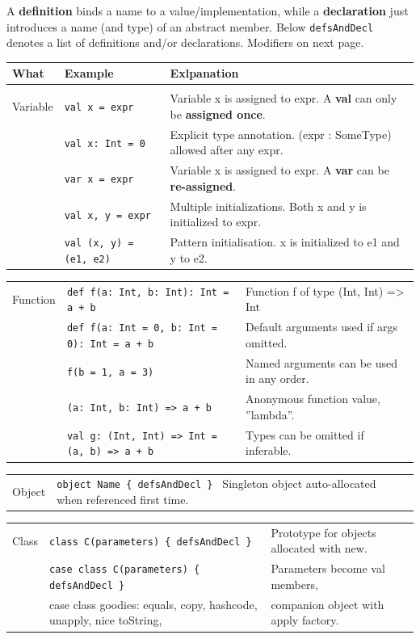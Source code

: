 \documentclass[article, a5paper]{memoir}
\newcommand{\code}{\lstinline[basicstyle=\ttfamily]}
\begin{document}
{\small
A \textbf{definition} binds a name to a value/implementation, while a \textbf{declaration} just introduces a name (and type) of an abstract member. Below \code|defsAndDecl| denotes a list of definitions and/or declarations. Modifiers on next page.  
\newcommand{\MoveUp}{\\[-0.9em]}
\newcommand{\FirstColWidth}{0.8cm}
\begin{tabular}{@{}p{\FirstColWidth} l l}\\
\textbf{What} & \textbf{Example} & \textbf{Exlpanation} \\ \hline \\[-0.5em]
Variable 
& \code|val x = expr|  & Variable x is assigned to expr. A \textbf{val} can only be \textbf{assigned once}. \\
& \code|val x: Int = 0|  & Explicit type annotation. (expr : SomeType) allowed after any expr.     \\ 
& \code|var x = expr|  & Variable x is assigned to expr. A \textbf{var} can be \textbf{re-assigned}. \\
& \code|val x, y = expr| & Multiple initializations. Both x and y is initialized to expr.\\
& \code|val (x, y) = (e1, e2)| & Pattern initialisation. x is initialized to e1 and y to e2. 
\end{tabular}
\begin{tabular}{@{}p{\FirstColWidth} l l}\MoveUp
Function
& \code|def f(a: Int, b: Int): Int = a + b| & Function f of type (Int, Int) => Int \\
& \code|def f(a: Int = 0, b: Int = 0): Int = a + b| & Default arguments used if args omitted. \\
&  \code|f(b = 1, a = 3)| & {\hspace{-0.25em} Named arguments can be used in any order.} \\
& \code|(a: Int, b: Int) => a + b| & Anonymous function value, ''lambda''.\\
& \code|val g: (Int, Int) => Int = (a, b) => a + b| & Types can be omitted if inferable.\\
\end{tabular}

\begin{tabular}{@{}p{\FirstColWidth} l l}\MoveUp
Object
& \code|object Name { defsAndDecl } | Singleton object auto-allocated when referenced first time.
\end{tabular}

\begin{tabular}{@{}p{\FirstColWidth} l l}\MoveUp
Class
& \code|class C(parameters) { defsAndDecl }| & Prototype for objects allocated with new. \\
& \code|case class C(parameters) { defsAndDecl }| & Parameters become val members, \\
& case class goodies: equals, copy, hashcode, unapply, nice toString, & \hspace{-1em}companion object with apply factory. \\
\end{tabular}

}
\end{document}
